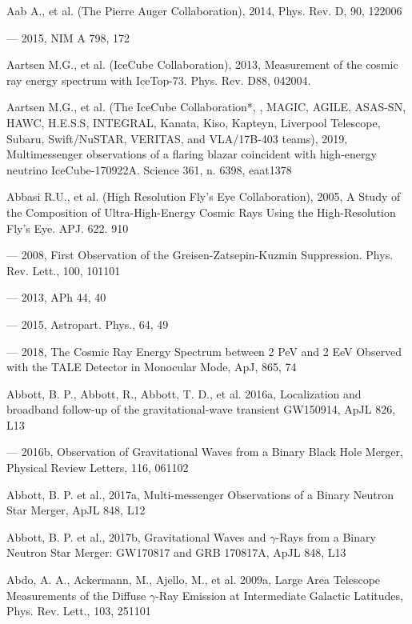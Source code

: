 
Aab A., et al. (The Pierre Auger Collaboration), 2014, Phys. Rev. D, 90, 122006

--- 2015, NIM A 798, 172

Aartsen M.G., et al. (IceCube Collaboration), 2013, Measurement of the cosmic ray energy spectrum with IceTop-73. Phys. Rev. D88, 
042004.

Aartsen M.G., et al. (The IceCube Collaboration*, \fermilat{}, MAGIC, AGILE, ASAS-SN, HAWC, H.E.S.S, INTEGRAL, Kanata, Kiso, Kapteyn, Liverpool Telescope, Subaru, Swift/NuSTAR, VERITAS, and VLA/17B-403 teams), 2019, Multimessenger observations of a flaring blazar coincident with high-energy neutrino IceCube-170922A. Science 361, n. 6398, eaat1378

Abbasi R.U., et al. (High Resolution Fly's Eye Collaboration), 2005, A Study of the Composition of Ultra-High-Energy Cosmic Rays Using the High-Resolution Fly's Eye. APJ. 622. 910

--- 2008, First Observation of the Greisen-Zatsepin-Kuzmin Suppression. Phys. Rev. Lett., 100, 101101

--- 2013, APh 44, 40

--- 2015, Astropart. Phys., 64, 49

--- 2018, The Cosmic Ray Energy Spectrum between 2 PeV and 2 EeV Observed with the TALE Detector in Monocular Mode, ApJ, 865, 74

Abbott, B. P., Abbott, R., Abbott, T. D., et al. 2016a, Localization and broadband follow-up of the gravitational-wave transient GW150914, ApJL 826, L13

--- 2016b, Observation of Gravitational Waves from a Binary Black Hole Merger, Physical Review Letters, 116, 061102

Abbott, B. P. et al., 2017a, Multi-messenger Observations of a Binary Neutron Star Merger, ApJL 848, L12

Abbott, B. P. et al., 2017b, Gravitational Waves and $\gamma$-Rays from a Binary Neutron Star Merger: GW170817 and GRB 170817A, ApJL 848, L13

Abdo, A. A., Ackermann, M., Ajello, M., et al. 2009a, \fermi{} Large Area Telescope Measurements of the Diffuse $\gamma$-Ray Emission at Intermediate Galactic Latitudes, Phys. Rev. Lett., 103, 251101


